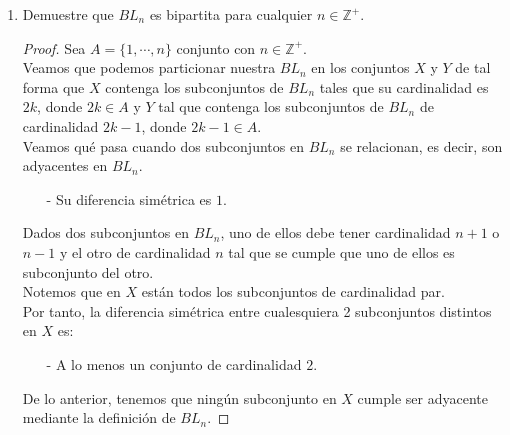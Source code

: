 \documentclass{article}
\begin{document}
\begin{enumerate}
\begin{enumerate}
        Luego hay $n$ aristas por cada v\'ertice (los cu\'ales son
        $2^n$, como ya vimos) y por el inciso ($c$) tenemos que
        $BL_n$ es bipartita. Esto aunado al hecho de que es
        $n$-regular, nos da partes en $BL_n$ de igual
        cardinalidad. De lo anterior hay una cantidad de aristas
        igual a $n$ por cada una de las partes. Es decir:
        \begin{eqnarray*}
          |E_{BL_n}| &=& n \cdot \frac{2^n}{2}\\
          &=& n \cdot 2^{n - 1}
        \end{eqnarray*}


        \hspace*{4 cm} $\therefore\ \ \ \ \ \abs{V_{BL_n}} = 2^n
        \text{ y } |E_{BL_n}| = n \cdot 2^{n -1}$
        \hfill $\square$

      \item Demuestre que $BL_n$ es bipartita para cualquier $n \in \mathbb{Z}^+$.

      \begin{proof}

        Sea $A = \{1, \dotsm,n\}$ conjunto con $n \in \mathbb{Z}^+$. \\
        Veamos que podemos particionar nuestra $BL_n$ en los conjuntos
        $X$ y $Y$ de tal forma que $X$ contenga los subconjuntos de
        $BL_n$ tales que su cardinalidad es $2k$, donde $2k \in A$  y
        $Y$ tal que contenga los subconjuntos de $BL_n$ de cardinalidad
        $2k -1$, donde $2k -1 \in A$. \\

        Veamos qu\'e pasa cuando dos subconjuntos en $BL_n$ se relacionan,
        es decir, son adyacentes en $BL_n$.

        \begin{itemize}
          \item[-] Su diferencia sim\'etrica es $1$.
        \end{itemize}

        Dados dos subconjuntos en $BL_n$, uno de ellos debe tener cardinalidad
        $n+1$ o $n-1$ y el otro de cardinalidad $n$ tal que se cumple que uno
        de ellos es subconjunto del otro. \\

        Notemos que en $X$ est\'an todos los subconjuntos de cardinalidad par. \\
        Por tanto, la diferencia sim\'etrica entre cualesquiera 2 subconjuntos
        distintos en $X$ es:
        \begin{itemize}
        \item[-] A lo menos un conjunto de cardinalidad $2$.
        \end{itemize}
        De lo anterior, tenemos que ning\'un subconjunto en
        $X$ cumple ser adyacente mediante la definici\'on de $BL_n$.


\end{proof}
\end{enumerate}
\end{enumerate}
\end{document}
